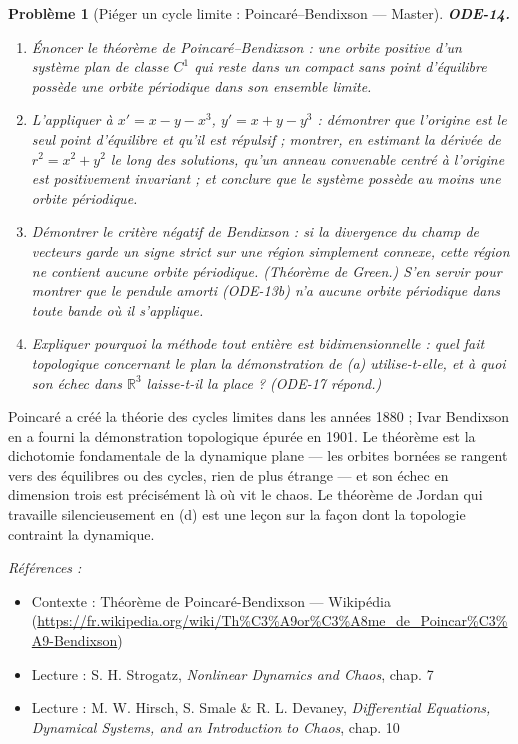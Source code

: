 \documentclass[11pt]{article}
\newtheorem{problem}{Problème}
\newenvironment{refs}{\par\small\noindent\emph{Références :}\begin{itemize}\setlength\itemsep{0pt}}{\end{itemize}\normalsize}
\begin{document}
\bigskip

\begin{problem}[{Piéger un cycle limite : Poincaré--Bendixson --- Master}]
\textbf{ODE-14.} \begin{enumerate}
\item[(a)] Énoncer le théorème de Poincaré--Bendixson : une orbite positive d'un système plan de classe
$ C^1 $ qui reste dans un compact sans point d'équilibre possède une orbite périodique dans son
ensemble limite.
\item[(b)] L'appliquer à $ x' = x - y - x^3 $, $ y' = x + y - y^3 $ : démontrer que l'origine est le
seul point d'équilibre et qu'il est répulsif ; montrer, en estimant la dérivée de
$ r^2 = x^2 + y^2 $ le long des solutions, qu'un anneau convenable centré à l'origine est
positivement invariant ; et conclure que le système possède au moins une orbite périodique.
\item[(c)] Démontrer le critère négatif de Bendixson : si la divergence du champ de vecteurs garde un
signe strict sur une région simplement connexe, cette région ne contient aucune orbite
périodique. (Théorème de Green.) S'en servir pour montrer que le pendule amorti (ODE-13b) n'a
aucune orbite périodique dans toute bande où il s'applique.
\item[(d)] Expliquer pourquoi la méthode tout entière est bidimensionnelle : quel fait topologique
concernant le plan la démonstration de (a) utilise-t-elle, et à quoi son échec dans
$ \mathbb{R}^3 $ laisse-t-il la place ? (ODE-17 répond.)
\end{enumerate}

\end{problem}

\noindent Poincaré a créé la théorie des cycles limites dans les années 1880 ; Ivar
Bendixson en a fourni la démonstration topologique épurée en 1901. Le théorème est la dichotomie
fondamentale de la dynamique plane --- les orbites bornées se rangent vers des équilibres ou des
cycles, rien de plus étrange --- et son échec en dimension trois est précisément là où vit le chaos.
Le théorème de Jordan qui travaille silencieusement en (d) est une leçon sur la façon dont la
topologie contraint la dynamique.

\begin{refs}
\item Contexte : Théorème de Poincaré-Bendixson --- Wikipédia (\url{https://fr.wikipedia.org/wiki/Th%C3%A9or%C3%A8me_de_Poincar%C3%A9-Bendixson})
\item Lecture : S. H. Strogatz, \textit{Nonlinear Dynamics and Chaos}, chap. 7
\item Lecture : M. W. Hirsch, S. Smale \& R. L. Devaney, \textit{Differential Equations, Dynamical Systems, and an Introduction to Chaos}, chap. 10
\end{refs}
\end{document}
